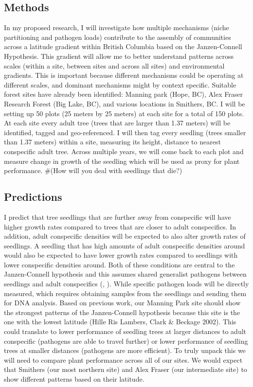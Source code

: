 \documentclass{article}
\begin{document}
\subsection{Methods}
In my proposed research, I will investigate how multiple mechanisms (niche partitioning and pathogen loads) contribute to the assembly of communities across a latitude gradient within British Columbia based on the Janzen-Connell Hypothesis. This gradient will allow me to better understand patterns across scales (within a site, between sites and across all sites) and environmental gradients. This is important because different mechanisms could be operating at different scales, and dominant mechanisms might by context specific. Suitable forest sites have already been identified: Manning park (Hope, BC), Alex Fraser Research Forest (Big Lake, BC), and various locations in Smithers, BC. I will be setting up 50 plots (25 meters by 25 meters) at each site for a total of 150 plots. At each site every adult tree (trees that are larger than 1.37 meters) will be identified, tagged and geo-referenced. I will then tag every seedling (trees smaller than 1.37 meters) within a site, measuring its height, distance to nearest conspecific adult tree. Across multiple years, we will come back to each plot and measure change in growth of the seedling which will be used as proxy for plant performance. #(How will you deal with seedlings that die?)

\subsection{Predictions}
I predict that tree seedlings that are further away from conspecific will have higher growth rates compared to trees that are closer to adult conspecifics. In addition, adult conspecific densities will be expected to also alter growth rates of seedlings. A seedling that has high amounts of adult conspecific densities around would also be expected to have lower growth rates compared to seedlings with lower conspecific densities around. Both of these conditions are central to the Janzen-Connell hypothesis and this assumes shared generalist pathogens between seedlings and adult conspecifics (\citep{Janzen1970}, \citep{Connell1978}). While specific pathogen loads will be directly measured, which requires obtaining samples from the seedlings and sending them for DNA analysis. Based on previous work, our Manning Park site should show the strongest patterns of the Janzen-Connell hypothesis because this site is the one with the lowest latitude (Hille Ris Lambers, Clark & Beckage 2002). This could translate to lower performance of seedling trees at larger distances to adult conspecific (pathogens are able to travel further) or lower performance of seedling trees at smaller distances (pathogens are more efficient). To truly unpack this we will need to compare plant performance across all of our sites. We would expect that Smithers (our most northern site) and Alex Fraser (our intermediate site) to show different patterns based on their latitude. 
\end{document}

